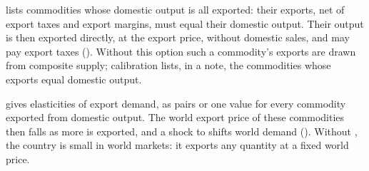 
\begin{optdesc}
\item[\optarg{exporto}{nly}{namelist}] lists commodities whose domestic output
is all exported: their exports, net of export taxes and export margins, must
equal their domestic output. Their output is then exported directly, at the
export price, without domestic sales, and may pay export taxes
(). Without this option such a commodity's exports are
drawn from composite supply; calibration lists, in a note, the commodities whose
exports equal domestic output.

\item[\optarg{exportd}{emand}{spec}] gives elasticities of export demand, as
\cmd{:} pairs or one value for every
commodity exported from domestic output. The world export price of these
commodities then falls as more is exported, and a shock to  shifts
world demand (). Without , the
country is small in world markets: it exports any quantity at a fixed world
price.
\end{optdesc}


